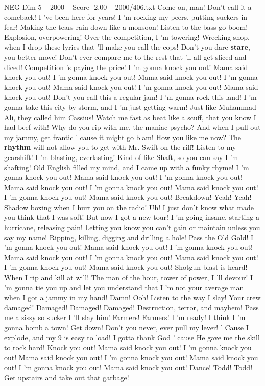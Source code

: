 \begin{textsample}{NEG Dim 5 – 2000 – Score -2.00 – 2000/406.txt}  \label{ex:f5_neg_031}
Come on, man!
Don't call it a comeback!
I 've been here for years!
I 'm rocking my peers, putting suckers in fear!
Making the tears rain down like a monsoon!
Listen to the bass go boom!
Explosion, overpowering!
Over the competition, I 'm towering!
Wrecking shop, when I drop these lyrics that 'll make you call the cops!
Don't you dare \textbf{stare}, you better move!
Don't ever compare me to the rest that 'll all get sliced and diced!
Competition 's paying the price!
I 'm gonna knock you out!
Mama said knock you out!
I 'm gonna knock you out!
Mama said knock you out!
I 'm gonna knock you out!
Mama said knock you out!
I 'm gonna knock you out!
Mama said knock you out!
Don't you call this a regular jam!
I 'm gonna rock this land!
I 'm gonna take this city by storm, and I 'm just getting warm!
Just like Muhammad Ali, they called him Cassius!
Watch me fast as beat like a scuff, that you know I had beef with!
Why do you rip with me, the maniac psycho?
And when I pull out my jammy, get frantic ' cause it might go blam!
How you like me now?
The \textbf{rhythm} will not allow you to get with Mr.
Swift on the riff!
Listen to my gearshift!
I 'm blasting, everlasting!
Kind of like Shaft, so you can say I 'm shafting!
Old English filled my mind, and I came up with a funky rhyme!
I 'm gonna knock you out!
Mama said knock you out!
I 'm gonna knock you out!
Mama said knock you out!
I 'm gonna knock you out!
Mama said knock you out!
I 'm gonna knock you out!
Mama said knock you out!
Breakdown!
Yeah!
Yeah!
Shadow boxing when I hurt you on the radio!
Uh!
I just don't know what made you think that I was soft!
But now I got a new tour!
I 'm going insane, starting a hurricane, releasing pain!
Letting you know you can't gain or maintain unless you say my name!
Ripping, killing, digging and drilling a hole!
Pass the Old Gold!
I 'm gonna knock you out!
Mama said knock you out!
I 'm gonna knock you out!
Mama said knock you out!
I 'm gonna knock you out!
Mama said knock you out!
I 'm gonna knock you out!
Mama said knock you out!
Shotgun blast is heard!
When I rip and kill at will!
The man of the hour, tower of power, I 'll devour!
I 'm gonna tie you up and let you understand that I 'm not your average man when I got a jammy in my hand!
Damn!
Ooh!
Listen to the way I slay!
Your crew damaged!
Damaged!
Damaged!
Damaged!
Destruction, terror, and mayhem!
Pass me a sissy so sucker I 'll slay him!
Farmers!
Farmers!
I 'm ready!
I think I 'm gonna bomb a town!
Get down!
Don't you never, ever pull my lever! ' Cause I explode, and my 9 is easy to load!
I gotta thank God ' cause He gave me the skill to rock hard!
Knock you out!
Mama said knock you out!
I 'm gonna knock you out!
Mama said knock you out!
I 'm gonna knock you out!
Mama said knock you out!
I 'm gonna knock you out!
Mama said knock you out!
Dance!
Todd!
Todd!
Get upstairs and take out that garbage!

\end{textsample}
